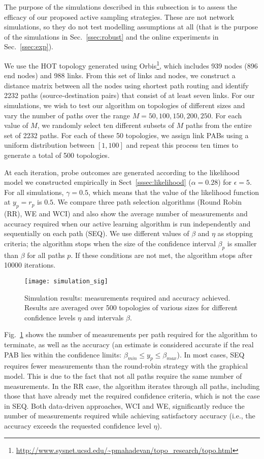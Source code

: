 \documentclass[final,5p,times,twocolumn]{elsarticle}
\begin{document}
The purpose of the simulations described in this subsection is to assess the efficacy of our proposed active sampling strategies. These are not network simulations, so they do not test modelling assumptions at all (that is the purpose of the simulations in Sec.~\ref{ssec:robust} and the online experiments in Sec.~\ref{ssec:exp}).  

We use the HOT topology generated using Orbis\footnote{\url{http://www.sysnet.ucsd.edu/~pmahadevan/topo_research/topo.html}}, which includes 939 nodes (896 end nodes) and 988 links.  From this set of links and nodes, we construct a distance matrix between all the nodes using shortest path routing and identify 2232 paths (source-destination pairs) that consist of at least seven links.  For our simulations, we wish to test our algorithm on topologies of different sizes and vary the number of paths over the range $M=50,100,150,200,250$.  For each value of $M$, we randomly select ten different subsets of $M$ paths from the entire set of 2232 paths.  For each of these 50 topologies, we assign link PABs using a uniform distribution between $[1,100]$ and repeat this process ten times to generate a total of 500 topologies.

At each iteration, probe outcomes are generated according to the likelihood model we constructed empirically in Sect~\ref{sssec:likelihood} ($\alpha = 0.28$) for $\epsilon=5$. For all simulations, $\gamma = 0.5$, which means that the value of the likelihood function at $y_p = r_p$ is $0.5$.  We compare three path selection algorithms (Round Robin (RR), WE and WCI) and also show the average number of measurements and accuracy required when our active learning algorithm is run independently and sequentially on each path (SEQ).  We use different values of $\beta$ and $\eta$ as stopping criteria; the algorithm stops when the size of the confidence interval $\beta_p$ is smaller than $\beta$ for all paths $p$.  If these conditions are not met, the algorithm stops after 10000 iterations. 

\begin{figure}[!t]
	\centering
	\texttt{[image: simulation\_sig]}
	\caption{Simulation results: measurements required and accuracy achieved. Results are averaged over 500 topologies of various sizes for different confidence levels $\eta$ and intervals $\beta$.}
	\label{fig:simulation_sig}
\end{figure}

Fig.~\ref{fig:simulation_sig} shows the number of measurements per path required for the algorithm to terminate, as well as the accuracy (an estimate is considered accurate if the real PAB lies within the confidence limits: $\beta_{min} \leq y_{p} \leq \beta_{max}$).  In most cases, SEQ requires fewer measurements than the round-robin strategy with the graphical model.  This is due to the fact that not all paths require the same number of measurements.  In the RR case, the algorithm iterates through all paths, including those that have already met the required confidence criteria, which is not the case in SEQ.  Both data-driven approaches, WCI and WE, significantly reduce the number of measurements required while achieving satisfactory accuracy (i.e., the accuracy exceeds the requested confidence level $\eta$).
\end{document}
